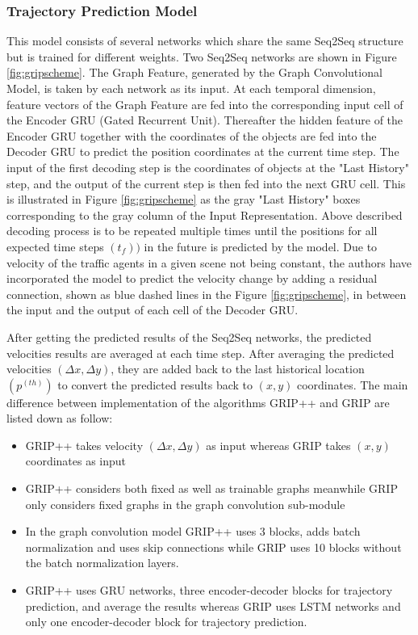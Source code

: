 \subsubsection{Trajectory Prediction Model}

\tab This model consists of several networks which share the same Seq2Seq structure but is trained for different weights. Two Seq2Seq networks are shown in Figure \ref{fig:gripscheme}. The Graph Feature, generated by the Graph Convolutional Model, is taken by each network as its input. At each temporal dimension, feature vectors of the Graph Feature are fed into the corresponding input cell of the Encoder GRU (Gated Recurrent Unit). Thereafter the hidden feature of the Encoder GRU together with the coordinates of the objects are fed into the Decoder GRU to predict the position coordinates at the current time step. The input of the first decoding step is the coordinates of objects at the "Last History" step, and the output of the current step is then fed into the next GRU cell. This is illustrated in Figure \ref{fig:gripscheme} as the gray "Last History" boxes corresponding to the gray column of the Input Representation. Above described decoding process is to be repeated multiple times until the positions for all expected time steps \((t_f))\) in the future is predicted by the model. Due to velocity of the traffic agents in a given scene not being constant, the authors have incorporated the model to predict the velocity change by adding a residual connection, shown as blue dashed lines in the Figure \ref{fig:gripscheme}, in between the input and the output of each cell of the Decoder GRU. 

\tab After getting the predicted results of the Seq2Seq networks, the predicted velocities results are averaged at each time step. After averaging the predicted velocities \((\Delta x, \Delta y)\), they are added back to the last historical location \((p^{(th)})\) to convert the predicted results back to \((x, y)\) coordinates. The main difference between implementation of the algorithms GRIP++ and GRIP are listed down as follow:

\begin{itemize}
    \item GRIP++ takes velocity \((\Delta x, \Delta y)\) as input whereas GRIP takes \((x, y)\) coordinates as input
    \item GRIP++ considers both fixed as well as trainable graphs meanwhile GRIP only considers fixed graphs in the graph convolution sub-module
    \item In the graph convolution model GRIP++ uses 3 blocks, adds batch normalization and uses skip connections while GRIP uses 10 blocks without the batch normalization layers.
    \item GRIP++ uses GRU networks, three encoder-decoder blocks for trajectory prediction, and average the results whereas GRIP uses LSTM networks and only one encoder-decoder block for trajectory prediction. 
\end{itemize}



